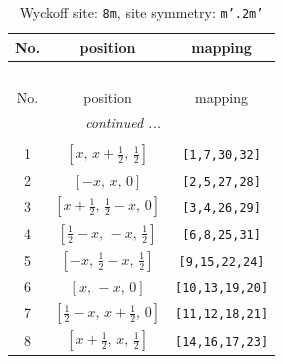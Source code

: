 \documentclass[fleqn,8pt]{jsarticle}
\begin{document}
\begin{longtable}{ccc}
\caption{Wyckoff site: {\tt 8m}, site symmetry: {\tt m'.2m'}}
 \\
 \hline \hline
No. & position & mapping \\ \hline \endfirsthead

\multicolumn{2}{l}{\tablename\ \thetable{}} \\
 \hline \hline
No. & position & mapping \\ \hline \endhead

 \hline \hline
\multicolumn{2}{r}{\footnotesize\it continued ...} \\ \endfoot

 \hline \hline
\multicolumn{2}{r}{} \\ \endlastfoot

1 & $\left[ x,\, x + \frac{1}{2},\, \frac{1}{2} \right]$ & {\tt [1,7,30,32]} \\ \hline
2 & $\left[ - x,\, x,\, 0 \right]$ & {\tt [2,5,27,28]} \\ \hline
3 & $\left[ x + \frac{1}{2},\, \frac{1}{2} - x,\, 0 \right]$ & {\tt [3,4,26,29]} \\ \hline
4 & $\left[ \frac{1}{2} - x,\, - x,\, \frac{1}{2} \right]$ & {\tt [6,8,25,31]} \\ \hline
5 & $\left[ - x,\, \frac{1}{2} - x,\, \frac{1}{2} \right]$ & {\tt [9,15,22,24]} \\ \hline
6 & $\left[ x,\, - x,\, 0 \right]$ & {\tt [10,13,19,20]} \\ \hline
7 & $\left[ \frac{1}{2} - x,\, x + \frac{1}{2},\, 0 \right]$ & {\tt [11,12,18,21]} \\ \hline
8 & $\left[ x + \frac{1}{2},\, x,\, \frac{1}{2} \right]$ & {\tt [14,16,17,23]} \\
\end{longtable}
\renewcommand{\arraystretch}{1.2}
\end{document}
